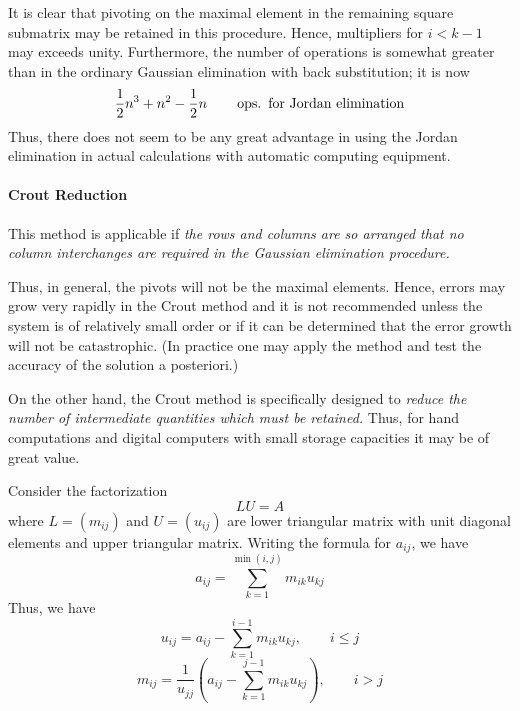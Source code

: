 \documentclass[../main.tex]{subfiles}
\begin{document}
It is clear that pivoting on the maximal element in the remaining square submatrix may be retained in this procedure. Hence, multipliers for $i < k-1$ may exceeds unity. Furthermore, the number of operations is somewhat greater than in the ordinary Gaussian elimination with back substitution; it is now
\begin{equation}
	\frac{1}{2} n^3 + n^2 - \frac{1}{2} n \qquad \operatorname{ops.} \text{ for Jordan elimination}
\end{equation}
Thus, there does not seem to be any great advantage in using the Jordan elimination in actual calculations with automatic computing equipment.

\paragraph{Crout Reduction} This method is applicable if \emph{the rows and columns are so arranged that no column interchanges are required in the Gaussian elimination procedure.}

Thus, in general, the pivots will not be the maximal elements. Hence, errors may grow very rapidly in the Crout method and it is not recommended unless the system is of relatively small order or if it can be determined that the error growth will not be catastrophic. (In practice one may apply the method and test the accuracy of the solution a posteriori.)

On the other hand, the Crout method is specifically designed to \emph{reduce the number of intermediate quantities which must be retained.} Thus, for hand computations and digital computers with small storage capacities it may be of great value.

Consider the factorization
\begin{equation*}
	L U = A
\end{equation*}
where $L=(m_{ij})$ and $U=(u_{ij})$ are lower triangular matrix with unit diagonal elements and upper triangular matrix. Writing the formula for $a_{ij}$, we have
\begin{equation*}
	a_{ij} = \sum_{k=1}^{\min(i,j)} m_{ik} u_{kj}
\end{equation*}
Thus, we have
\begin{equation} \label{eq:crout-reduction-u}
	u_{ij} = a_{ij} - \sum_{k=1}^{i-1} m_{ik} u_{kj}, \qquad i \leq j
\end{equation}
\begin{equation} \label{eq:crout-reduction-l}
	m_{ij} = \frac{1}{u_{jj}} \left( a_{ij} - \sum_{k=1}^{j-1} m_{ik} u_{kj} \right), \qquad i > j
\end{equation}
\end{document}
